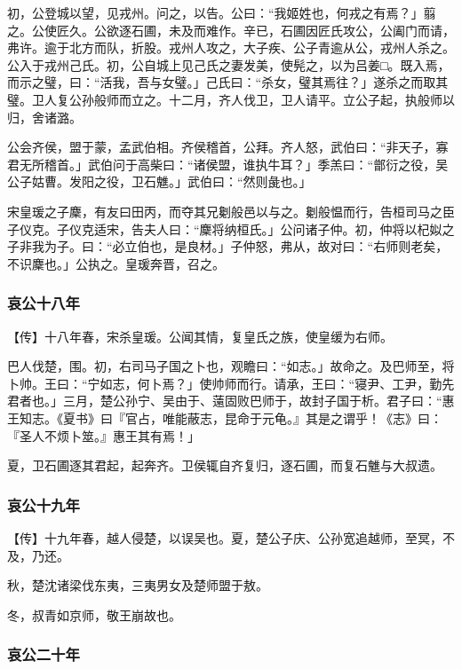 \documentclass[]{article}
\begin{document}
初，公登城以望，见戎州。问之，以告。公曰：``我姬姓也，何戎之有焉？」翦之。公使匠久。公欲逐石圃，未及而难作。辛已，石圃因匠氏攻公，公阖门而请，弗许。逾于北方而队，折股。戎州人攻之，大子疾、公子青逾从公，戎州人杀之。公入于戎州己氏。初，公自城上见己氏之妻发美，使髡之，以为吕姜□。既入焉，而示之璧，曰：``活我，吾与女璧。」己氏曰：``杀女，璧其焉往？」遂杀之而取其璧。卫人复公孙般师而立之。十二月，齐人伐卫，卫人请平。立公子起，执般师以归，舍诸潞。

公会齐侯，盟于蒙，孟武伯相。齐侯稽首，公拜。齐人怒，武伯曰：``非天子，寡君无所稽首。」武伯问于高柴曰：``诸侯盟，谁执牛耳？」季羔曰：``鄫衍之役，吴公子姑曹。发阳之役，卫石魋。」武伯曰：``然则彘也。」

宋皇瑗之子麇，有友曰田丙，而夺其兄劖般邑以与之。劖般愠而行，告桓司马之臣子仪克。子仪克适宋，告夫人曰：``麇将纳桓氏。」公问诸子仲。初，仲将以杞姒之子非我为子。曰：``必立伯也，是良材。」子仲怒，弗从，故对曰：``右师则老矣，不识麇也。」公执之。皇瑗奔晋，召之。

\hypertarget{header-n3242}{%
\subsubsection{哀公十八年}\label{header-n3242}}

【传】十八年春，宋杀皇瑗。公闻其情，复皇氏之族，使皇缓为右师。

巴人伐楚，围。初，右司马子国之卜也，观瞻曰：``如志。」故命之。及巴师至，将卜帅。王曰：``宁如志，何卜焉？」使帅师而行。请承，王曰：``寝尹、工尹，勤先君者也。」三月，楚公孙宁、吴由于、薳固败巴师于，故封子国于析。君子曰：``惠王知志。《夏书》曰『官占，唯能蔽志，昆命于元龟。』其是之谓乎！《志》曰：『圣人不烦卜筮。』惠王其有焉！」

夏，卫石圃逐其君起，起奔齐。卫侯辄自齐复归，逐石圃，而复石魋与大叔遗。

\hypertarget{header-n3248}{%
\subsubsection{哀公十九年}\label{header-n3248}}

【传】十九年春，越人侵楚，以误吴也。夏，楚公子庆、公孙宽追越师，至冥，不及，乃还。

秋，楚沈诸梁伐东夷，三夷男女及楚师盟于敖。

冬，叔青如京师，敬王崩故也。

\hypertarget{header-n3254}{%
\subsubsection{哀公二十年}\label{header-n3254}}
\end{document}
